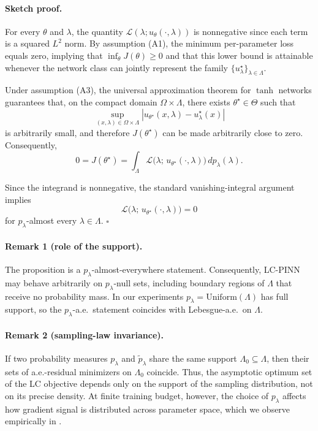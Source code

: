 \documentclass{article}
\theoremstyle{plain}
\theoremstyle{definition}
\theoremstyle{remark}
\begin{document}
\paragraph{Sketch proof.}
For every $\theta$ and $\lambda$, the quantity
$\mathcal{L}(\lambda;u_\theta(\cdot,\lambda))$ is nonnegative since
each term is a squared $L^2$ norm. By assumption (A1), the minimum
per-parameter loss equals zero, implying that
$\inf_\theta J(\theta)\geq0$ and that this lower bound is attainable
whenever the network class can jointly represent the family
$\{u^\star_\lambda\}_{\lambda\in\Lambda}$.

Under assumption (A3), the universal approximation theorem for
$\tanh$ networks \citep{hornik1991,pinkus1999} guarantees that, on the
compact domain $\Omega \times \Lambda$, there exists
$\theta^\star \in \Theta$ such that
\[
   \sup_{(x,\lambda)\in\Omega\times\Lambda}
   |u_{\theta^\star}(x,\lambda)-u^\star_\lambda(x)|
\]
is arbitrarily small, and therefore $J(\theta^\star)$ can be made
arbitrarily close to zero. Consequently,
\[
   0
   =
   J(\theta^\star)
   =
   \int_\Lambda
      \mathcal{L}\bigl(
         \lambda;\,
         u_{\theta^\star}(\cdot,\lambda)
      \bigr)
   \,dp_\lambda(\lambda).
\]

Since the integrand is nonnegative, the standard vanishing-integral
argument implies
\[
   \mathcal{L}\bigl(
      \lambda;\,
      u_{\theta^\star}(\cdot,\lambda)
   \bigr)
   =
   0
\]
for $p_\lambda$-almost every $\lambda \in \Lambda$.
\hfill $\square$

\paragraph{Remark 1 (role of the support).}
The proposition is a $p_\lambda$-almost-everywhere statement.
Consequently, LC-PINN may behave arbitrarily on $p_\lambda$-null sets,
including boundary regions of $\Lambda$ that receive no probability
mass. In our experiments
$p_\lambda=\mathrm{Uniform}(\Lambda)$ has full support, so the
$p_\lambda$-a.e.\ statement coincides with Lebesgue-a.e.\ on
$\Lambda$.

\paragraph{Remark 2 (sampling-law invariance).}
If two probability measures $p_\lambda$ and $\tilde p_\lambda$ share
the same support $\Lambda_0 \subseteq \Lambda$, then their sets of
a.e.-residual minimizers on $\Lambda_0$ coincide. Thus, the asymptotic
optimum set of the LC objective depends only on the support of the
sampling distribution, not on its precise density. At finite training
budget, however, the choice of $p_\lambda$ affects how gradient signal
is distributed across parameter space, which we observe empirically in
.
\end{document}
